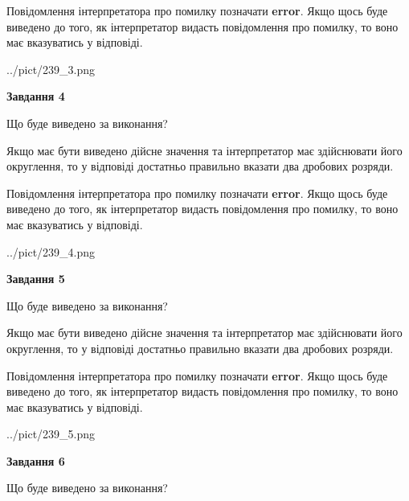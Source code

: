 \documentclass[12pt, ukrainian]{article}
\begin{document}
{\begin {Large}
Повідомлення інтерпретатора про помилку позначати \textbf{error}.
Якщо щось буде виведено до того, як інтерпретатор видасть повідомлення про помилку, 
то воно має вказуватись у відповіді. \par

\begin{center}
	{../pict/239_3.png}
\end{center}
\newpage

{\begin {center}\textbf{Завдання 4}\end {center}}\par
Що буде виведено за виконання? \par

Якщо має бути виведено дійсне значення та інтерпретатор має здійснювати його округлення, 
то у відповіді достатньо правильно вказати два дробових розряди.

Повідомлення інтерпретатора про помилку позначати \textbf{error}.
Якщо щось буде виведено до того, як інтерпретатор видасть повідомлення про помилку, 
то воно має вказуватись у відповіді. \par

\begin{center}
	{../pict/239_4.png}
\end{center}
\newpage

{\begin {center}\textbf{Завдання 5}\end {center}}\par
Що буде виведено за виконання? \par

Якщо має бути виведено дійсне значення та інтерпретатор має здійснювати його округлення, 
то у відповіді достатньо правильно вказати два дробових розряди.

Повідомлення інтерпретатора про помилку позначати \textbf{error}.
Якщо щось буде виведено до того, як інтерпретатор видасть повідомлення про помилку, 
то воно має вказуватись у відповіді. \par

\begin{center}
	{../pict/239_5.png}
\end{center}
\newpage

{\begin {center}\textbf{Завдання 6}\end {center}}\par
Що буде виведено за виконання? \par


\end{Large}}
\end{document}
